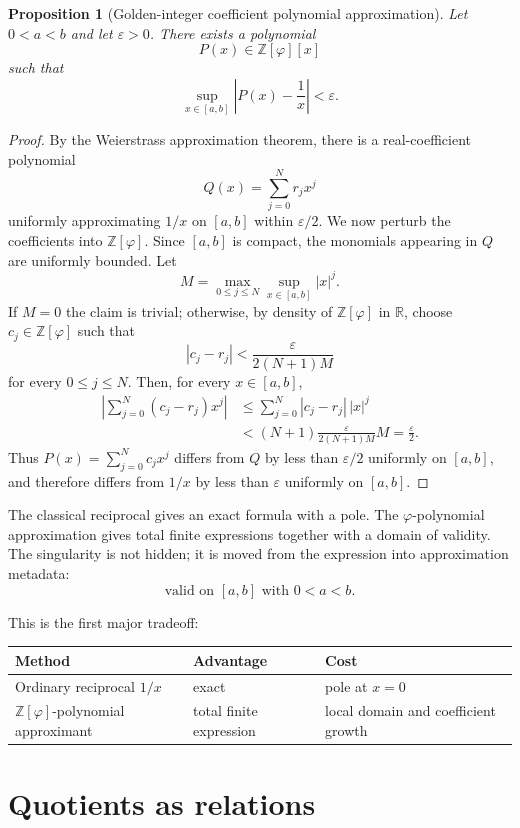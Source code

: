 \documentclass[11pt]{article}
\newtheorem{proposition}[definition]{Proposition}
\newcommand{\ph}{\varphi}
\newcommand{\Z}{\mathbb{Z}}
\newcommand{\R}{\mathbb{R}}
\begin{document}
\begin{proposition}[Golden-integer coefficient polynomial approximation]
Let $0<a<b$ and let $\varepsilon>0$.  There exists a polynomial
\[
    P(x)\in \Z[\ph][x]
\]
such that
\[
    \sup_{x\in[a,b]}\left|P(x)-\frac1x\right|<\varepsilon.
\]
\end{proposition}

\begin{proof}
By the Weierstrass approximation theorem, there is a real-coefficient polynomial
\[
    Q(x)=\sum_{j=0}^N r_jx^j
\]
uniformly approximating $1/x$ on $[a,b]$ within $\varepsilon/2$.  We now perturb the coefficients into $\Z[\ph]$.  Since $[a,b]$ is compact, the monomials appearing in $Q$ are uniformly bounded.  Let
\[
    M=\max_{0\le j\le N}\sup_{x\in[a,b]} |x|^j.
\]
If $M=0$ the claim is trivial; otherwise, by density of $\Z[\ph]$ in $\R$, choose $c_j\in\Z[\ph]$ such that
\[
    |c_j-r_j|<\frac{\varepsilon}{2(N+1)M}
\]
for every $0\le j\le N$.  Then, for every $x\in[a,b]$,
\[
\begin{aligned}
    \left|\sum_{j=0}^N(c_j-r_j)x^j\right|
    &\le \sum_{j=0}^N |c_j-r_j|\,|x|^j \\
    &< (N+1)\frac{\varepsilon}{2(N+1)M}M
     =\frac{\varepsilon}{2}.
\end{aligned}
\]
Thus $P(x)=\sum_{j=0}^N c_jx^j$ differs from $Q$ by less than $\varepsilon/2$ uniformly on $[a,b]$, and therefore differs from $1/x$ by less than $\varepsilon$ uniformly on $[a,b]$.
\end{proof}

The classical reciprocal gives an exact formula with a pole.  The $\ph$-polynomial approximation gives total finite expressions together with a domain of validity.  The singularity is not hidden; it is moved from the expression into approximation metadata:
\[
    \text{valid on }[a,b]\text{ with }0<a<b.
\]

This is the first major tradeoff:
\begin{center}
\begin{tabular}{lll}
\toprule
Method & Advantage & Cost \\
\midrule
Ordinary reciprocal $1/x$ & exact & pole at $x=0$ \\
$\Z[\ph]$-polynomial approximant & total finite expression & local domain and coefficient growth \\
\bottomrule
\end{tabular}
\end{center}

\section{Quotients as relations}
\end{document}
